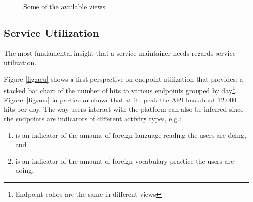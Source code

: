 \documentclass{sig-alternate-05-2015}
\begin{document}

\begin{figure*}[t]
	\centering
	\qquad
	\qquad
	\caption{Some of the available views\label{fig:views}}
\end{figure*}

     



\subsection{Service Utilization}
\label{sec:util}

The most fundamental insight that a service maintainer needs regards service utilization. %

Figure \ref{fig:aeu} shows a first perspective on endpoint utilization that \tool provides: a stacked bar chart of the number of hits to various endpoints grouped by day\footnote{Endpoint colors are the same in different views}. Figure~\ref{fig:aeu} in particular shows that at its peak the API has about 12.000 hits per day. 
The way users interact with the platform can also be inferred since the endpoints are indicators of different activity types, e.g.: 

\begin{enumerate}
	
	\item {\color{myred} \epTranslations} is an indicator of the amount of foreign language reading the users are doing, and 
	
	\item {\color{mygreen} \epOutcome} is an indicator of the amount of foreign vocabulary practice the users are doing.
	
\end{enumerate}


\end{document}
